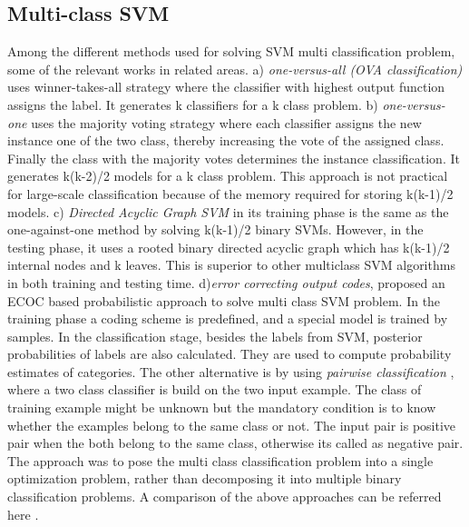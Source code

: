 \documentclass[letterpaper]{article}
\begin{document}
\subsection{Multi-class SVM}
Among the different methods used for solving SVM multi classification problem, some of the relevant works in related areas. a) \textit{one-versus-all (OVA classification)} uses winner-takes-all strategy where the classifier with highest output function assigns the label. It generates k classifiers for a k class problem.
b) \textit{one-versus-one} uses the majority voting strategy where each classifier assigns the new instance one of the two class, thereby increasing the vote of the assigned class. Finally the class with the majority votes determines the instance classification.
It generates k(k-2)/2 models for a k class problem. This approach is not practical for large-scale classification because of the memory required for storing k(k-1)/2 models.
c) \textit{Directed Acyclic Graph SVM} in its training phase is the same as the one-against-one method by solving k(k-1)/2 binary SVMs. However, in the testing phase, it uses a rooted binary directed acyclic graph which has k(k-1)/2 internal nodes and k leaves. This is superior to other multiclass SVM algorithms in both training and testing time.
d)\textit{error correcting output codes}, \cite{multiclassSVM_ecoc} proposed an ECOC based probabilistic approach to solve multi class SVM problem. In the training phase a coding scheme is predefined, and a special model is trained by samples. In the classification stage, besides the labels from SVM, posterior probabilities of labels are also calculated. They are used to compute probability estimates of categories.
The other alternative is by using \textit{pairwise classification} \cite{pairwise}, where a two class classifier is build on the two input example. The class of training example might be unknown but the mandatory condition is to know whether the examples belong to the same class or not. The input pair is positive pair when the both belong to the same class, otherwise its called as negative pair. \\
The \cite{crammer} approach was to pose the multi class classification problem into a single optimization problem, rather than decomposing it into multiple binary classification problems.
A comparison of the above approaches can be referred here \cite{comparison}.
\end{document}
